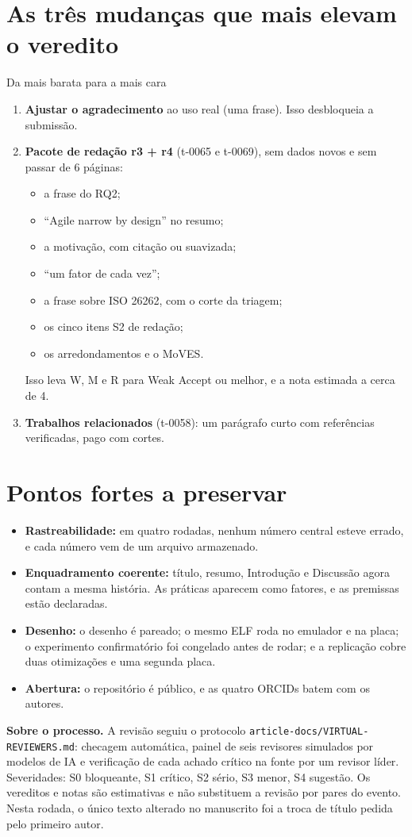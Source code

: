 \documentclass[10pt,a4paper]{article}
\begin{document}
\section{As três mudanças que mais elevam o veredito}
\begin{keybox}{Da mais barata para a mais cara}
\begin{enumerate}[leftmargin=1.4em]
\item \textbf{Ajustar o agradecimento} ao uso real (uma frase). Isso desbloqueia a submissão.
\item \textbf{Pacote de redação r3 + r4} (t-0065 e t-0069), sem dados novos e sem passar de 6 páginas:
  \begin{itemize}
  \item a frase do RQ2;
  \item ``Agile narrow by design'' no resumo;
  \item a motivação, com citação ou suavizada;
  \item ``um fator de cada vez'';
  \item a frase sobre ISO 26262, com o corte da triagem;
  \item os cinco itens S2 de redação;
  \item os arredondamentos e o MoVES.
  \end{itemize}
  Isso leva W, M e R para Weak Accept ou melhor, e a nota estimada a cerca de 4.
\item \textbf{Trabalhos relacionados} (t-0058): um parágrafo curto com referências verificadas, pago com cortes.
\end{enumerate}
\end{keybox}

\section{Pontos fortes a preservar}
\begin{itemize}
\item \textbf{Rastreabilidade:} em quatro rodadas, nenhum número central esteve errado, e cada número vem de um arquivo armazenado.
\item \textbf{Enquadramento coerente:} título, resumo, Introdução e Discussão agora contam a mesma história. As práticas aparecem como fatores, e as premissas estão declaradas.
\item \textbf{Desenho:} o desenho é pareado; o mesmo ELF roda no emulador e na placa; o experimento confirmatório foi congelado antes de rodar; e a replicação cobre duas otimizações e uma segunda placa.
\item \textbf{Abertura:} o repositório é público, e as quatro ORCIDs batem com os autores.
\end{itemize}

\vfill
{\footnotesize\color{muted}
\textbf{Sobre o processo.} A revisão seguiu o protocolo \texttt{article-docs/VIRTUAL-REVIEWERS.md}: checagem automática, painel de seis revisores simulados por modelos de IA e verificação de cada achado crítico na fonte por um revisor líder. Severidades: S0 bloqueante, S1 crítico, S2 sério, S3 menor, S4 sugestão. Os vereditos e notas são estimativas e não substituem a revisão por pares do evento. Nesta rodada, o único texto alterado no manuscrito foi a troca de título pedida pelo primeiro autor.}
\end{document}

